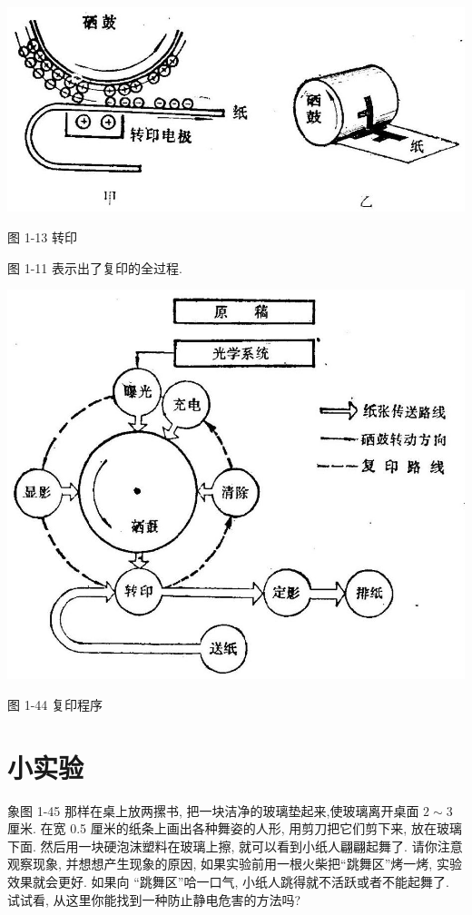 \documentclass[10pt]{article}
\begin{document}
\begin{center}
\includegraphics[max width=1.0\textwidth]{images/01913056-1f15-74d8-9184-9aab52c9d66b_54_512568.jpg}
\end{center}

图 1-13 转印

图 1-11 表示出了复印的全过程.

\begin{center}
\includegraphics[max width=1.0\textwidth]{images/01913056-1f15-74d8-9184-9aab52c9d66b_54_621416.jpg}
\end{center}

图 1-44 复印程序

\section*{小实验}

象图 1-45 那样在桌上放两摞书, 把一块洁净的玻璃垫起来,使玻璃离开桌面 \(2 \sim 3\) 厘米. 在宽 0.5 厘米的纸条上画出各种舞姿的人形, 用剪刀把它们剪下来, 放在玻璃下面. 然后用一块硬泡沫塑料在玻璃上擦, 就可以看到小纸人翩翩起舞了. 请你注意观察现象, 并想想产生现象的原因, 如果实验前用一根火柴把“跳舞区”烤一烤, 实验效果就会更好. 如果向 “跳舞区”哈一口气, 小纸人跳得就不活跃或者不能起舞了. 试试看, 从这里你能找到一种防止静电危害的方法吗?
\end{document}
